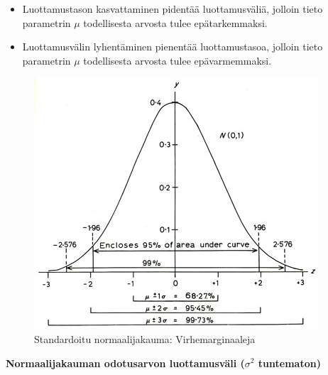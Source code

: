 \documentclass[
]{book}
\providecommand{\tightlist}{%
  \setlength{\itemsep}{0pt}\setlength{\parskip}{0pt}}
\begin{document}
\begin{itemize}
  \begin{itemize}
  \tightlist
  \item
    Luottamustason kasvattaminen pidentää luottamusväliä, jolloin tieto parametrin \(\mu\) todellisesta arvosta tulee epätarkemmaksi.
  \item
    Luottamusvälin lyhentäminen pienentää luottamustasoa, jolloin tieto parametrin \(\mu\) todellisesta arvosta tulee epävarmemmaksi.
  \end{itemize}
\end{itemize}

\begin{figure}

{\centering \includegraphics[width=1.5\linewidth]{images/gaussian-distribution} 

}

\caption{Standardoitu normaalijakauma: Virhemarginaaleja}\label{fig:foo}
\end{figure}

\hfill\break

\textbf{Normaalijakauman odotusarvon luottamusväli (\(\sigma^2\) tuntematon)}
\end{document}
